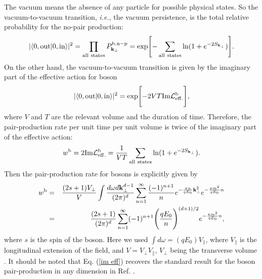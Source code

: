 \documentclass[a4paper,prd,showpacs,preprintnumbers,amsmath,amssymb]{revtex4}
\begin{document}
The vacuum means the absence of any particle for possible physical
states. So the vacuum-to-vacuum transition, {\it i.e.}, the vacuum
persistence, is the total relative probability for the no-pair
production:
\begin{equation}
\vert \langle 0, {\rm out} \vert 0, {\rm in} \rangle \vert^2 =
\prod_{\rm all~ states} P^{\rm b.n-p}_{{\bf k}_{\perp}} = \exp
\Biggl[ - \sum_{\rm all~states} \ln (1 + e^{- 2S_{{\bf
k}_{\perp}}}) \Biggr].
\end{equation}
On the other hand, the vacuum-to-vacuum transition is given by the
imaginary part of the effective action for boson
\begin{equation}
\vert \langle 0, {\rm out} \vert 0, {\rm in} \rangle \vert^2 =
\exp \Biggl[ - 2 V T {\rm Im} {\cal L}^{\rm b}_{\rm eff.} \Biggr],
\end{equation}
where $V$ and $T$ are the relevant volume and the duration of
time. Therefore, the pair-production rate per unit time per unit
volume is twice of the imaginary part of the effective action:
\begin{equation}
w^{\rm b} =  2{\rm Im} {\cal L}^{\rm b}_{\rm eff.} = \frac{1}{V T}
 \sum_{\rm all~states} \ln (1 + e^{- 2S_{{\bf
k}_{\perp}}}). \label{b-p}
\end{equation}
Then the pair-production rate for bosons is explicitly given by
\begin{eqnarray}
w^{\rm b} &=& \frac{(2s+1)V_{\perp}}{V}  \int \frac{d \omega d{\bf
k}_{\perp}^{d-1}}{(2\pi)^d} \sum_{n = 1}^{\infty}
\frac{(-1)^{n+1}}{n} e^{- \frac{\pi n}{q E_0} {\bf k}_{\perp}^2}
e^{- \frac{\pi m^2}{q E_0} n} \nonumber\\ &=&
\frac{(2s+1)}{(2\pi)^d} \sum_{n = 1}^{\infty}
(-1)^{n+1}\Biggl(\frac{q E_0}{n} \Biggr)^{(d+1)/2} e^{- \frac{\pi
m^2}{q E_0} n}, \label{im eff}
\end{eqnarray}
where $s$ is the spin of the boson. Here we used $\int d \omega =
(qE_0) V_{\parallel}$, where $V_{\parallel}$ is the longitudinal
extension of the field, and $V = V_{\perp} V_{\parallel}$,
$V_{\perp}$ being the transverse volume \cite{nik}. It should be
noted that Eq. (\ref{im eff}) recovers the standard result for the
boson pair-production in any dimension in Ref. \cite{gus}.
\end{document}
